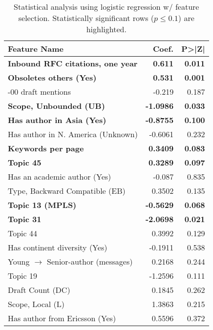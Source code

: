 \begin{table}
\begin{tabular}{lrr}
\toprule
Feature Name & Coef. & P>|Z| \\
\midrule
\textbf{Inbound RFC citations, one year} & \textbf{0.611} & \textbf{0.011} \\
\textbf{Obsoletes others (Yes)} & \textbf{0.531} & \textbf{0.001} \\
-00 draft mentions & -0.219 & 0.187 \\
\textbf{Scope, Unbounded (UB)} & \textbf{-1.0986} & \textbf{0.033} \\
\textbf{Has author in Asia (Yes)} & \textbf{-0.8755} & \textbf{0.100} \\
Has author in N. America (Unknown) & -0.6061 & 0.232 \\
\textbf{Keywords per page} & \textbf{0.3409} & \textbf{0.083} \\
\textbf{Topic 45} & \textbf{0.3289} & \textbf{0.097} \\
Has an academic author (Yes) & -0.087 & 0.835 \\
Type, Backward Compatible (EB) & 0.3502 & 0.135 \\
\textbf{Topic 13 (MPLS)} & \textbf{-0.5629} & \textbf{0.068} \\
\textbf{Topic 31} & \textbf{-2.0698} & \textbf{0.021} \\
Topic 44 & 0.3992 & 0.129 \\
Has continent diversity (Yes) & -0.1911 & 0.538 \\
Young $\rightarrow$ Senior-author (messages) & 0.2168 & 0.244 \\
Topic 19 & -1.2596 & 0.111 \\
Draft Count (DC) & 0.1845 & 0.262 \\
Scope, Local (L) & 1.3863 & 0.215 \\
Has author from Ericsson (Yes) & 0.5596 & 0.372 \\
\bottomrule
\end{tabular}
\caption{Statistical analysis using logistic regression w/ feature selection. Statistically significant rows ($p \leq 0.1$) are highlighted.}
\label{tbl:statsfs}
\end{table}

